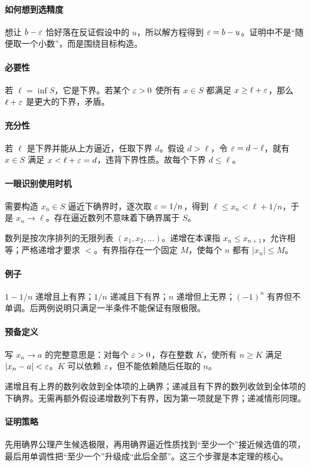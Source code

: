 \paragraph{如何想到选精度}想让 $b-\varepsilon$ 恰好落在反证假设中的 $u$，所以解方程得到 $\varepsilon=b-u$。证明中不是“随便取一个小数”，而是围绕目标构造。

\paragraph{必要性}若 $\ell=\inf S$，它是下界。若某个 $\varepsilon>0$ 使所有 $x\in S$ 都满足 $x\ge\ell+\varepsilon$，那么 $\ell+\varepsilon$ 是更大的下界，矛盾。
\paragraph{充分性}若 $\ell$ 是下界并能从上方逼近，任取下界 $d$。假设 $d>\ell$，令 $\varepsilon=d-\ell$，就有 $x\in S$ 满足 $x<\ell+\varepsilon=d$，违背下界性质。故每个下界 $d\le\ell$。
\paragraph{一眼识别使用时机}需要构造 $x_n\in S$ 逼近下确界时，逐次取 $\varepsilon=1/n$，得到 $\ell\le x_n<\ell+1/n$，于是 $x_n\to\ell$。存在逼近数列不意味着下确界属于 $S$。

数列是按次序排列的无限列表 $(x_1,x_2,\ldots)$。递增在本课指 $x_n\le x_{n+1}$，允许相等；严格递增才要求 $<$。有界指存在一个固定 $M$，使每个 $n$ 都有 $|x_n|\le M$。
\paragraph{例子}$1-1/n$ 递增且上有界；$1/n$ 递减且下有界；$n$ 递增但上无界；$(-1)^n$ 有界但不单调。后两例说明只满足一半条件不能保证有限极限。
\paragraph{预备定义}写 $x_n\to a$ 的完整意思是：对每个 $\varepsilon>0$，存在整数 $K$，使所有 $n\ge K$ 满足 $|x_n-a|<\varepsilon$。$K$ 可以依赖 $\varepsilon$，但不能依赖随后任取的 $n$。

递增且有上界的数列收敛到全体项的上确界；递减且有下界的数列收敛到全体项的下确界。无需再额外假设递增数列下有界，因为第一项就是下界；递减情形同理。
\paragraph{证明策略}先用确界公理产生候选极限，再用确界逼近性质找到“至少一个”接近候选值的项，最后用单调性把“至少一个”升级成“此后全部”。这三个步骤是本定理的核心。
